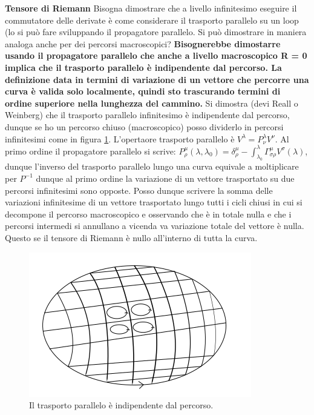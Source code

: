 \documentclass[10pt,a4paper]{article}
\begin{document}
\textbf{Tensore di Riemann}
Bisogna dimostrare che a livello infinitesimo eseguire il commutatore delle derivate è come considerare il trasporto parallelo su un loop (lo si può fare sviluppando il propagatore parallelo. Si può dimostrare in maniera analoga anche per dei percorsi macroscopici? 
\textbf{Bisognerebbe dimostarre usando il propagatore parallelo che anche a livello macroscopico R = 0 implica che il trasporto parallelo è indipendente dal percorso. La definizione data in termini di variazione di un vettore che percorre una curva è valida solo localmente, quindi sto trascurando termini di ordine superiore nella lunghezza del cammino.}
Si dimostra (devi Reall o Weinberg) che il trasporto parallelo infinitesimo è indipendente dal percorso, dunque se ho un percorso chiuso (macroscopico) posso dividerlo in percorsi infinitesimi come in figura \ref{trasporto}. L'opertaore trasporto parallelo è $V^{\lambda} = P^{\lambda}_{\nu} V^{\nu}$. Al primo ordine il propagatore parallelo si scrive: $P^{\mu}_{\rho}(\lambda, \lambda_0) = \delta^{\mu}_{\rho}-\int_{\lambda_0}^{\lambda} \Gamma ^{\mu}_{\sigma \rho} V^{\sigma}(\lambda)$, dunque l'inverso del trasporto parallelo lungo una curva equivale a moltiplicare per $P^{-1}$ dunque al primo ordine la variazione di un vettore trasportato su due percorsi infinitesimi sono opposte. Posso dunque scrivere la somma delle variazioni infinitesime di un vettore trasportato lungo tutti i cicli chiusi in cui si decompone il percorso macroscopico e osservando che è in totale nulla e che i percorsi intermedi si annullano a vicenda va variazione totale del vettore è nulla. Questo se il tensore di Riemann è nullo all'interno di tutta la curva.

\begin{figure}[!htb]
  \centering
  \includegraphics[scale=.5]{trasporto.png}
\caption{Il trasporto parallelo è indipendente dal percorso.}
\label{trasporto}
\end{figure}
\end{document}
